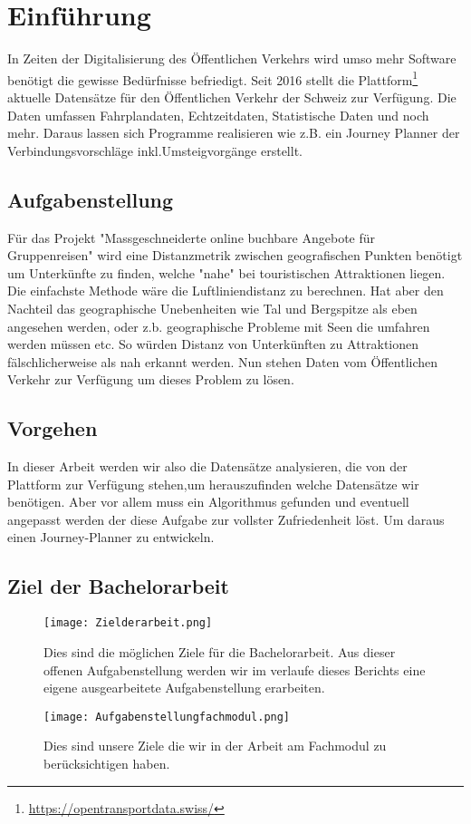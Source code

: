 \section{Einführung}
\label{sec:Einfuehrung}
In Zeiten der Digitalisierung des Öffentlichen Verkehrs wird umso mehr Software benötigt die gewisse Bedürfnisse befriedigt. Seit 2016 stellt die Plattform\footnote{\url{https://opentransportdata.swiss/}} aktuelle Datensätze für den Öffentlichen Verkehr der Schweiz zur Verfügung. Die Daten umfassen Fahrplandaten, Echtzeitdaten, Statistische Daten und noch mehr. Daraus lassen sich Programme realisieren wie z.B. ein Journey Planner der Verbindungsvorschläge inkl.Umsteigvorgänge erstellt. 

\subsection{Aufgabenstellung}
\label{Aufgabenstellung}
Für das Projekt "Massgeschneiderte online buchbare Angebote für Gruppenreisen" wird eine Distanzmetrik zwischen geografischen Punkten benötigt um Unterkünfte zu finden, welche "nahe" bei touristischen Attraktionen liegen. Die einfachste Methode wäre die Luftliniendistanz zu berechnen. Hat aber den Nachteil das geographische Unebenheiten wie Tal und Bergspitze als eben angesehen werden, oder z.b. geographische Probleme mit Seen die umfahren werden müssen etc. So würden Distanz von Unterkünften zu Attraktionen fälschlicherweise als nah erkannt werden. Nun stehen Daten vom Öffentlichen Verkehr zur Verfügung um dieses Problem zu lösen.

\subsection{Vorgehen}
\label{Vorgehen}
In dieser Arbeit werden wir also die Datensätze analysieren, die von der Plattform zur Verfügung stehen,um herauszufinden welche Datensätze wir benötigen. Aber vor allem muss ein Algorithmus gefunden und eventuell angepasst werden der diese Aufgabe zur vollster Zufriedenheit löst. Um daraus einen Journey-Planner zu entwickeln.



\subsection{Ziel der Bachelorarbeit}
\label{Ziel der Bachelorarbeit}
\begin{figure}[]
	\centering
	\texttt{[image: Zielderarbeit.png]}
	\caption{Dies sind die möglichen Ziele für die Bachelorarbeit. Aus dieser offenen Aufgabenstellung werden wir im verlaufe dieses Berichts eine eigene ausgearbeitete Aufgabenstellung erarbeiten.}
	\label{fig:Ziel der Arbeit}
\end{figure}

\begin{figure}[]
	\centering
	\texttt{[image: Aufgabenstellungfachmodul.png]}
	\caption{Dies sind unsere Ziele die wir in der Arbeit am Fachmodul zu berücksichtigen haben. }
	\label{fig:Aufgabenstellung Fachmodul}
\end{figure}